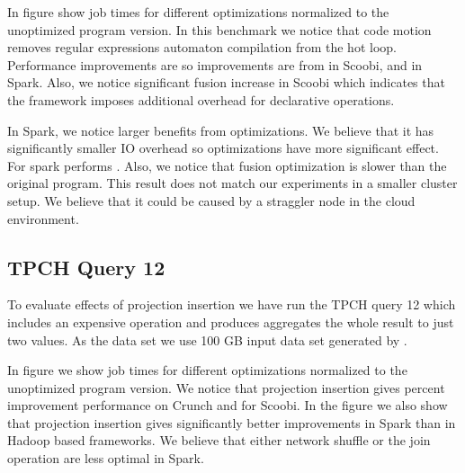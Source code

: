 In figure \todo{\ref{}} show job times for different optimizations normalized to the unoptimized program version. In this benchmark we notice that code motion removes regular expressions automaton compilation from the hot loop. Performance improvements are so improvements are from  in Scoobi,  and in Spark. Also, we notice significant fusion increase in Scoobi which indicates that the framework imposes additional overhead for declarative operations. 

In Spark, we notice larger benefits from optimizations. We believe that it has significantly smaller IO overhead so optimizations have more significant effect. For spark \tool performs . Also, we notice that fusion optimization is slower than the original program. This result does not match our experiments in a smaller cluster setup. We believe that it could be caused by a straggler node in the cloud environment.

\subsection{TPCH Query 12}
\label{subsec:tpch-query-12}

To evaluate effects of projection insertion we have run the TPCH query 12 which includes an expensive  operation and produces aggregates the whole result to just two values. As the data set we use 100 GB input data set generated by . 

In figure \todo{\ref{}} we show job times for different optimizations normalized to the unoptimized program version. We notice that projection insertion gives  percent improvement performance on Crunch and  for Scoobi. In the figure we also show that projection insertion gives significantly better improvements in Spark than in Hadoop based frameworks. We believe that either network shuffle or the join operation are less optimal in Spark. 


